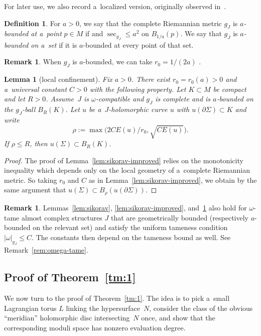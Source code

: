 \documentclass[pdftex]{sigma}
\numberwithin{equation}{section}
\DeclareMathOperator{\inj}{inj}
\DeclareMathOperator{\Sec}{sec}
\newtheorem{lm}[Theorem]{Lemma}
\theoremstyle{definition}
\newtheorem{df}[Theorem]{Definition}
\newtheorem{rem}[Theorem]{Remark}
\begin{document}
For later use, we also record a~localized version, originally observed in~\cite{GromanFloerOpen}.
\begin{df}\label{df:a-bounded}
 For $a>0$, we say that the complete Riemannian metric $g_J$ is \emph{$a$-bounded at a~point} $p\in M$ if \smash{$\inj_{g_J}(p)\ge \frac{1}{a}$} and $\Sec_{g_J}\le a^{2}$ on $B_{1/a}(p)$. We say that $g_J$ is \emph{$a$-bounded on a~set} if it is $a$-bounded at every point of that set.
\end{df}
\begin{rem}
 When $g_J$ is $a$-bounded, we can take $r_0=1/(2a)$ \cite[Theorem 4.4.1 and Remark~4.4.3]{McDuffSalamonJHol}.
\end{rem}

\begin{lm}[local confinement]\label{lem:local-confinement}
Fix $a>0$. There exist $r_0=r_0(a)>0$ and a~universal constant $C>0$ with the following property. Let $K\subset M$ be compact and let $R>0$.
Assume~$J$ is $\omega$-compatible and $g_J$ is complete and is $a$-bounded on the $g_J$-ball $B_{R}(K)$.
Let $u$ be a~$J$-holomorphic curve $u$ with $u(\partial\Sigma)\subset K$ and write
\[
\rho:=\max\bigl(2CE(u)/r_0,\sqrt{CE(u)}\bigr).
\]
If $\rho\le R$, then $u(\Sigma)\subset B_R(K)$.
\end{lm}
\begin{proof}
The proof of Lemma~\ref{lem:sikorav-improved} relies on the monotonicity inequality which depends only on the local geometry of a~complete Riemannian metric. So taking $r_0$ and $C$ as in Lemma~\ref{lem:sikorav-improved}, we obtain by the same argument that
$
u(\Sigma)\subset B_{\rho}(u(\partial\Sigma))
$.
\end{proof}

\begin{rem}
Lemmas~\ref{lem:sikorav}, \ref{lem:sikorav-improved}, and~\ref{lem:local-confinement} also hold for $\omega$-tame almost complex structures $J$ that are geometrically bounded (respectively $a$-bounded on the relevant set) and satisfy the uniform tameness condition $|\omega|_{g_J}\le C$. The constants then depend on the tameness bound as well. See Remark~\ref{rem:omega-tame}.
\end{rem}

\subsection{Proof of Theorem~\ref{tm:1}}\label{subsec:Proof:tm:1}
We now turn to the proof of Theorem~\ref{tm:1}.
The idea is to pick a~small Lagrangian torus $L$ linking the hypersurface~$N$, consider the class of the obvious ``meridian'' holomorphic disc intersecting~$N$ once, and show that the corresponding moduli space has nonzero evaluation degree.
\end{document}
